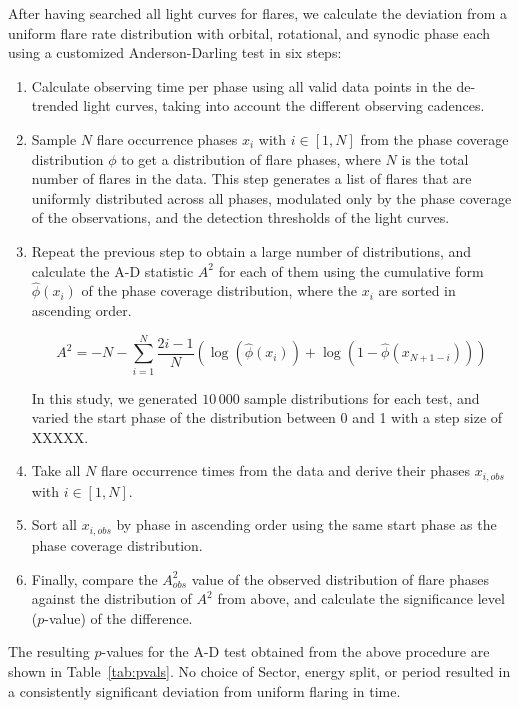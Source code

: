\documentclass[fleqn,usenatbib,letters]{mnras}%
\begin{document}
After having searched all light curves for flares, we calculate the deviation from a uniform flare rate distribution with orbital, rotational, and synodic phase each using a customized Anderson-Darling test in six steps:
\begin{enumerate}
\item Calculate observing time per phase using all valid data points in the de-trended light curves, taking into account the different observing cadences.
\item Sample $N$ flare occurrence phases $x_i$ with $i \in [1,N]$ from the phase coverage distribution $\phi$ to get a distribution of flare phases, where $N$ is the total number of flares in the data. This step generates a list of flares that are uniformly distributed across all phases, modulated only by the phase coverage of the observations, and the detection thresholds of the light curves. 
\item Repeat the previous step to obtain a large number of distributions, and calculate the A-D statistic $A^2$ for each of them using the cumulative form $\hat{\phi}(x_i)$ of the phase coverage distribution, where the $x_i$ are sorted in ascending order. 

\begin{equation}
A^2 = - N -\displaystyle\sum_{i=1}^N \dfrac{2i-1}{N}\left(\log(\hat{\phi}(x_i))+\log(1-\hat{\phi}(x_{N+1-i}))\right)
\end{equation}

In this study, we generated $10\,000$ sample distributions for each test, and varied the start phase of the distribution between 0 and 1 with a step size of XXXXX.
\item Take all $N$ flare occurrence times from the data and derive their phases $x_{i,obs}$ with $i \in [1,N]$. 
\item Sort all $x_{i,obs}$ by phase in ascending order using the same start phase as the phase coverage distribution.
\item Finally, compare the $A^2_{obs}$ value of the observed distribution of flare phases against the distribution of $A^2$ from above, and calculate the significance level ($p$-value) of the difference. 
\end{enumerate}

The resulting $p$-values for the A-D test obtained from the above procedure are shown in Table~\ref{tab:pvals}. No choice of Sector, energy split, or period resulted in a consistently significant deviation from uniform flaring in time. 
\end{document}
